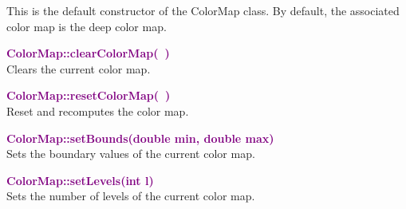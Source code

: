 This is the default constructor of the ColorMap class. By default, the associated color map is the deep color map.

\textcolor{purple}{\textbf{ColorMap::clearColorMap(~)}}\label{ColorMap::clearColorMap()}\\
Clears the current color map.


\textcolor{purple}{\textbf{ColorMap::resetColorMap(~)}}\label{ColorMap::resetColorMap()}\\
Reset and recomputes the color map.


\textcolor{purple}{\textbf{ColorMap::setBounds(double min, double max)}}\label{ColorMap::setBounds(double min, double max)}\\
Sets the boundary values of the current color map.

\begin{tcolorbox}[width=\textwidth,myArgs,tabularx={ll|R}]


\end{tcolorbox}


\textcolor{purple}{\textbf{ColorMap::setLevels(int l)}}\label{ColorMap::setLevels(int l)}\\
Sets the number of levels of the current color map.

\begin{tcolorbox}[width=\textwidth,myArgs,tabularx={ll|R}]

\end{tcolorbox}


